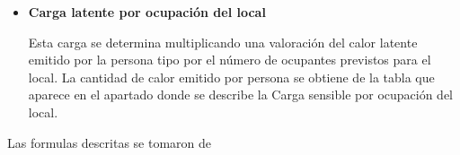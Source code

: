 \begin{itemize}
\begin{itemize}
	 {Donde:}
	\begin{align*}
		Q & : \text{carga térmica latente por ventilación o infiltración de aire (W)} \\
		V & : \text{caudal de aire infiltrado o de ventilación (m}^3/\text{h)} \\
		\Delta w & : \text{diferencia de humedad absoluta entre el ambiente exterior y el interior (ºC)}
	\end{align*}
	
\item \textbf{Carga latente por ocupación del local}
	
	Esta carga se determina multiplicando una valoración del calor latente emitido por la persona tipo por el número de ocupantes previstos para el local. La cantidad de calor emitido por persona se obtiene de la tabla que aparece en el apartado donde se describe la Carga sensible por ocupación del local.
	
\end{itemize}
Las formulas descritas se tomaron de \cite{bruno-2024,carrier-1980,sampp-2023}\rsp
\end{itemize}

